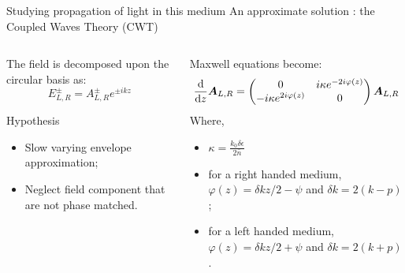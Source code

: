 \documentclass[aspectratio=169]{beamer}
\begin{document}
\begin{frame}{Studying propagation of light in this medium}
	An approximate solution : the Coupled Waves Theory (CWT)
	\pause
	\begin{columns}
		\begin{column}{0.5\textwidth}
			The field is decomposed upon the circular basis as:
			\begin{equation*}
			E_{L,R}^\pm = A_{L,R}^\pm e^{\pm ikz}
			\end{equation*}
			\begin{block}{Hypothesis}
				\begin{itemize}
					\item Slow varying envelope approximation;
					\item Neglect field component that are not phase matched.
				\end{itemize}
			\end{block}
		\end{column}
		\pause
		\begin{column}{0.5\textwidth}
			Maxwell equations become:
			\begin{equation*}
			\dv{z}\bm{A}_{L,R} = \begin{pmatrix}0 & i\kappa e^{-2i\varphi(z)} \\ -i\kappa e^{2i\varphi(z)} & 0\end{pmatrix}\bm{A}_{L,R}
			\end{equation*}
			Where,
			\begin{itemize}
				\item $\kappa = \frac{k_0\delta\epsilon}{2\bar{n}}$
				\item for a right handed medium, $\varphi(z) = \delta kz / 2 - \psi$ and $\delta k = 2(k-p)$;
				\item for a left handed medium, $\varphi(z) = \delta kz / 2 + \psi$ and $\delta k = 2(k+p)$.
			\end{itemize}
		\end{column}
	\end{columns}
\end{frame}
\end{document}
